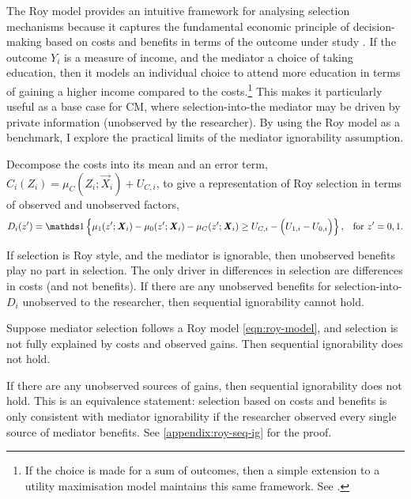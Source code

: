 The Roy model provides an intuitive framework for analysing selection mechanisms because it captures the fundamental economic principle of decision-making based on costs and benefits in terms of the outcome under study \citep{roy1951some,heckman1990empirical}.
If the outcome $Y_i$ is a measure of income, and the mediator a choice of taking education, then it models an individual choice to attend more education in terms of gaining a higher income compared to the costs.\footnote{
    If the choice is made for a sum of outcomes, then a simple extension to a utility maximisation model maintains this same framework.
    See \cite{heckman1990empirical,eisenhauer2015generalized}.
}
This makes it particularly useful as a base case for CM, where selection-into-the mediator may be driven by private information (unobserved by the researcher).
By using the Roy model as a benchmark, I explore the practical limits of the mediator ignorability assumption.

Decompose the costs into its mean and an error term, $C_i(Z_i) = \mu_{C}(Z_i; \vec X_i) + U_{C,i}$, to give a representation of Roy selection in terms of observed and unobserved factors,
\[ D_i(z') = \indicator{
    \mu_1(z'; \vec X_i) - \mu_0(z'; \vec X_i) - \mu_C(z'; \vec X_i)
    \geq U_{C,i} - \Big(U_{1,i} - U_{0,i}\Big) }
        , \;\;\; \text{for } z'=0,1. \]

If selection is Roy style, and the mediator is ignorable, then unobserved benefits play no part in selection.
The only driver in differences in selection are differences in costs (and not benefits).
If there are any unobserved benefits for selection-into-$D_i$ unobserved to the researcher, then sequential ignorability cannot hold.
\begin{definition}
    \label{def:roy-seq-ig}
    Suppose mediator selection follows a Roy model \eqref{eqn:roy-model}, and selection is not fully explained by costs and observed gains.
    Then sequential ignorability does not hold.
\end{definition}
If there are any unobserved sources of gains, then sequential ignorability does not hold.
This is an equivalence statement: selection based on costs and benefits is only consistent with mediator ignorability if the researcher observed every single source of mediator benefits.
See \autoref{appendix:roy-seq-ig} for the proof.


